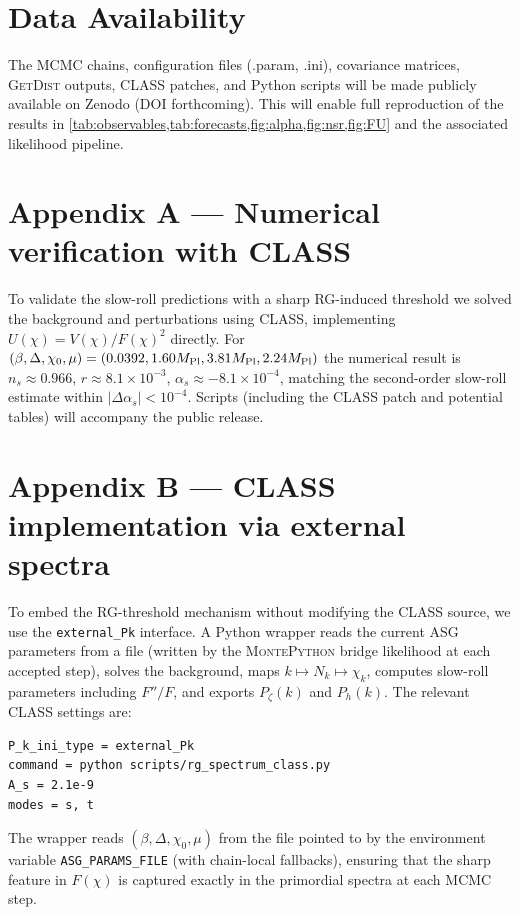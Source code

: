 \documentclass[11pt,a4paper]{article}
\begin{document}
\section{Data Availability}
\label{sec:data}
The MCMC chains, configuration files (.param, .ini), covariance matrices, \textsc{GetDist} outputs, \textsc{CLASS} patches, and Python scripts will be made publicly available on Zenodo (DOI forthcoming). This will enable full reproduction of the results in \cref{tab:observables,tab:forecasts,fig:alpha,fig:nsr,fig:FU} and the associated likelihood pipeline.

\appendix

\section{Appendix A --- Numerical verification with CLASS}
To validate the slow-roll predictions with a sharp RG-induced threshold we solved the background and perturbations using \textsc{CLASS}, implementing $U(\chi)=V(\chi)/F(\chi)^{2}$ directly. For $(\beta,\Delta,\chi_{0},\mu)=(0.0392,1.60M_{\rm Pl},3.81M_{\rm Pl},2.24M_{\rm Pl})$ the numerical result is $n_{s}\approx0.966$, $r\approx8.1\times10^{-3}$, $\alpha_{s}\approx-8.1\times10^{-4}$, matching the second-order slow-roll estimate within $|\Delta\alpha_{s}|<10^{-4}$. Scripts (including the \textsc{CLASS} patch and potential tables) will accompany the public release.

\section{Appendix B --- CLASS implementation via external spectra}
To embed the RG-threshold mechanism without modifying the \textsc{CLASS} source, we use the \texttt{external\_Pk} interface. A Python wrapper reads the current ASG parameters from a file (written by the \textsc{MontePython} bridge likelihood at each accepted step), solves the background, maps $k\mapsto N_{k}\mapsto \chi_{k}$, computes slow-roll parameters including $F''/F$, and exports $P_{\zeta}(k)$ and $P_{h}(k)$. The relevant \textsc{CLASS} settings are:
\begin{verbatim}
P_k_ini_type = external_Pk
command = python scripts/rg_spectrum_class.py
A_s = 2.1e-9
modes = s, t
\end{verbatim}
The wrapper reads $(\beta,\Delta,\chi_0,\mu)$ from the file pointed to by the environment variable \texttt{ASG\_PARAMS\_FILE} (with chain-local fallbacks), ensuring that the sharp feature in $F(\chi)$ is captured exactly in the primordial spectra at each MCMC step.
\end{document}
